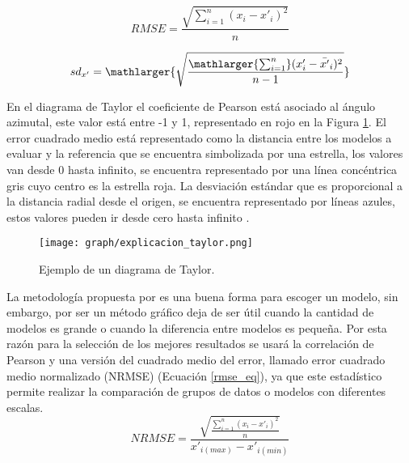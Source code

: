 \begin{equation}\label{rmse_eq_1}
RMSE =\frac{\sqrt{\sum_{i=1}^n (x_i-x'_i)^2}}{n}
\end{equation}

\begin{equation}\label{sd_eq}
sd_{x'} =\mathlarger{\sqrt{\frac{\mathlarger{\sum_{i=1}^n} (x'_i-\bar{x'}_i)^2}{n-1}}}
\end{equation}

En el diagrama de Taylor el coeficiente de Pearson está asociado al ángulo azimutal, este valor está entre -1 y 1, representado en rojo en la Figura \ref{fig_explicacion_taylor}. El error cuadrado medio está representado como la distancia entre los modelos a evaluar y la referencia que se encuentra simbolizada por una estrella, los valores van desde 0 hasta infinito, se encuentra representado por una línea concéntrica gris cuyo centro es la estrella roja. La desviación estándar que es proporcional a la distancia radial desde el origen, se encuentra representado por líneas azules, estos valores pueden ir desde cero hasta infinito \citep{taylor_diag_2018}.\\

\begin{figure}[h]
    \centering
	\label{fig_explicacion_taylor}
	\texttt{[image: graph/explicacion\_taylor.png]}
	\caption{Ejemplo de un diagrama de Taylor.}
\end{figure}

La metodología propuesta por \citet{taylor2001summarizing} es una buena forma para escoger un modelo, sin embargo, por ser un método gráfico deja de ser útil cuando la cantidad de modelos es grande o cuando la diferencia entre modelos es pequeña. Por esta razón para la selección de los mejores resultados se usará la correlación de Pearson y una versión del cuadrado medio del error, llamado error cuadrado medio normalizado (NRMSE) (Ecuación \ref{rmse_eq}), ya que este estadístico permite realizar la comparación de grupos de datos o modelos con diferentes escalas.\\

\begin{equation}\label{rmse_eq}
NRMSE =\frac{\sqrt{\frac{\sum_{i=1}^n (x_i-x'_i)^2}{n}}}{x'_{i(max)} - x'_{i(min)}}
\end{equation}


